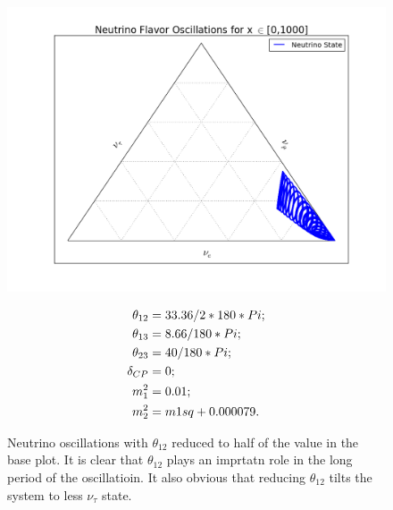 \documentclass[letterpaper,12pt,english]{sphinxmanual}
\begin{document}
\begin{figure}[htbp]
\centering
\capstart

\includegraphics{1000-2.png}
\caption{Neutrino oscillations with \(\theta_{12}\) reduced to half of the value in the base plot. It is clear that \(\theta_{12}\) plays an imprtatn role in the long period of the oscillatioin. It also obvious that reducing \(\theta_{12}\) tilts the system to less \(\nu_\tau\) state.}{\small \begin{gather}
\begin{split}\theta_{12} &= 33.36/2* 180 * Pi; \\
\theta_{13} &= 8.66/180*Pi; \\
\theta_{23} &= 40/180*Pi;\\
\delta_{CP} &= 0;\\
m_1^2 &= 0.01;\\
m_2^2 &= m1sq + 0.000079.\end{split}\notag
\end{gather}}\end{figure}
\end{document}
